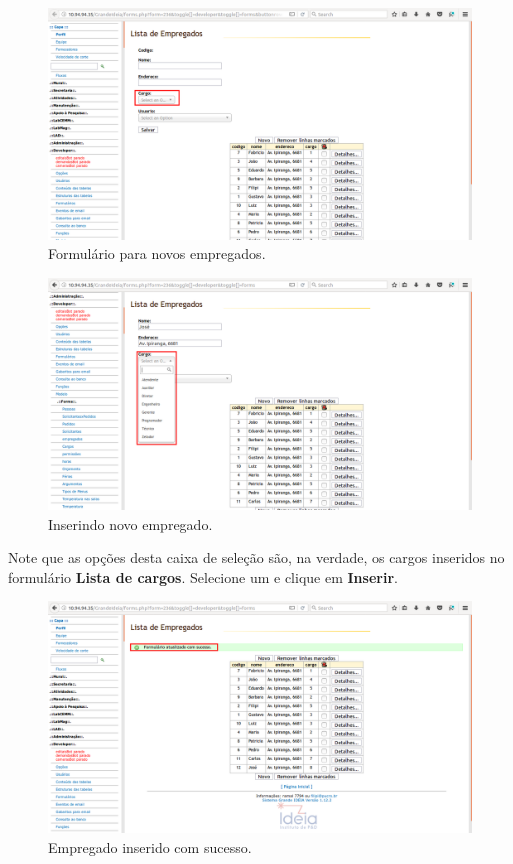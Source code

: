 \documentclass[9pt]{report}
\begin{document}
{       \begin{figure}[H]
        \includegraphics[width=\textwidth]{2_Formularios/3_Relacionamento_1_N/35.png}
        \caption{Formulário para novos empregados.}
        \label{fig:novosempregados}
       \end{figure}

       \begin{figure}[H]
        \includegraphics[width=\textwidth]{2_Formularios/3_Relacionamento_1_N/36.png}
        \caption{Inserindo novo empregado.}
        \label{fig:novoempregado}
       \end{figure}

       Note que as opções desta caixa de seleção são, na verdade, os
       cargos inseridos no formulário \textbf{Lista de cargos}.
       Selecione um e clique em \textbf{Inserir}.

       \begin{figure}[H]
        \includegraphics[width=\textwidth]{2_Formularios/3_Relacionamento_1_N/37.png}
        \caption{Empregado inserido com sucesso.}
        \label{fig:empregadoinserido}
       \end{figure}

}
\end{document}
